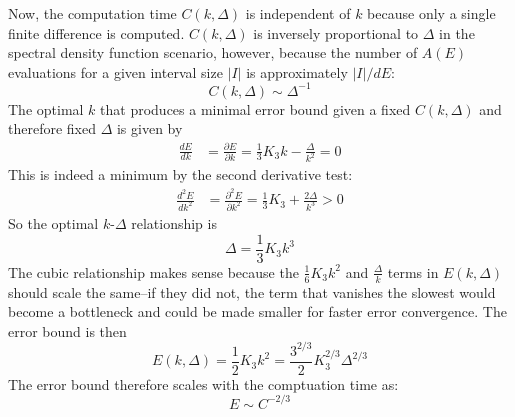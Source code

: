 \documentclass[letterpaper,11pt]{article}
\newcommand*{\deriv}[2]{\frac{d #1}{d #2}}
\newcommand*{\pderiv}[2]{\frac{\partial #1}{\partial #2}}
\newcommand*{\nderiv}[3]{\frac{d^{#3} #1}{d #2^{#3}}}
\newcommand*{\npderiv}[3]{\frac{\partial^{#3} #1}{\partial #2^{#3}}}
\begin{document}
\begin{flushleft}
    Now, the computation time $C(k, \Delta)$ is independent of $k$ because only a single finite difference is computed. $C(k, \Delta)$ is inversely proportional to $\Delta$ in the spectral density function scenario, however, because the number of $A(E)$ evaluations for a given interval size $|I|$ is approximately $|I|/dE$:
    $$\boxed{C(k, \Delta) \sim \Delta^{-1}}$$
    The optimal $k$ that produces a minimal error bound given a fixed $C(k, \Delta)$ and therefore fixed $\Delta$ is given by
    \begin{align*}
        \deriv{E}{k} &= \pderiv{E}{k} = \frac{1}{3}K_3k - \frac{\Delta}{k^2} = 0
    \end{align*}
    This is indeed a minimum by the second derivative test:
    \begin{align*}
        \nderiv{E}{k}{2} &= \npderiv{E}{k}{2} = \frac{1}{3}K_3 + \frac{2\Delta}{k^3} > 0
    \end{align*}
    So the optimal $k$-$\Delta$ relationship is
    $$\boxed{\Delta = \frac{1}{3}K_3k^3}$$
    The cubic relationship makes sense because the $\frac{1}{6}K_3k^2$ and $\frac{\Delta}{k}$ terms in $E(k, \Delta)$ should scale the same--if they did not, the term that vanishes the slowest would become a bottleneck and could be made smaller for faster error convergence. The error bound is then
    $$\boxed{E(k, \Delta) = \frac{1}{2}K_3k^2 = \frac{3^{2/3}}{2}K_3^{2/3}\Delta^{2/3}}$$
    The error bound therefore scales with the comptuation time as:
    $$\boxed{E \sim C^{-2/3}}$$


\end{flushleft}
\end{document}
